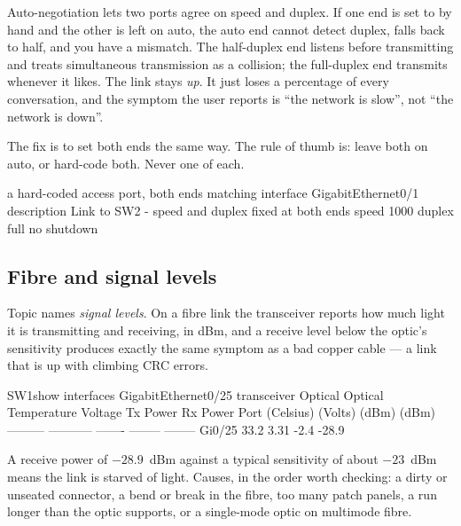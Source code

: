 \begin{conceptbox}
Auto-negotiation lets two ports agree on speed and duplex. If one end is set to
 by hand and the other is left on auto, the auto end cannot
detect duplex, falls back to half, and you have a mismatch. The half-duplex end
listens before transmitting and treats simultaneous transmission as a collision;
the full-duplex end transmits whenever it likes. The link stays \emph{up}. It
just loses a percentage of every conversation, and the symptom the user reports
is ``the network is slow'', not ``the network is down''.

The fix is to set both ends the same way. The rule of thumb is: leave both on
auto, or hard-code both. Never one of each.
\end{conceptbox}

\begin{config}{a hard-coded access port, both ends matching}
interface GigabitEthernet0/1
 description Link to SW2 - speed and duplex fixed at both ends
 speed 1000
 duplex full
 no shutdown
\end{config}

\subsection{Fibre and signal levels}

Topic  names \emph{signal levels}. On a fibre link the transceiver
reports how much light it is transmitting and receiving, in dBm, and a receive
level below the optic's sensitivity produces exactly the same symptom as a bad
copper cable --- a link that is up with climbing CRC errors.

\begin{verify}{SW1}{show interfaces GigabitEthernet0/25 transceiver}
                             Optical   Optical
           Temperature  Voltage  Tx Power  Rx Power
Port       (Celsius)    (Volts)  (dBm)     (dBm)
---------  -----------  -------  --------  --------
Gi0/25       33.2         3.31     -2.4     -28.9
\end{verify}

A receive power of $-28.9$~dBm against a typical sensitivity of about $-23$~dBm
means the link is starved of light. Causes, in the order worth checking: a dirty
or unseated connector, a bend or break in the fibre, too many patch panels, a
run longer than the optic supports, or a single-mode optic on multimode fibre.

